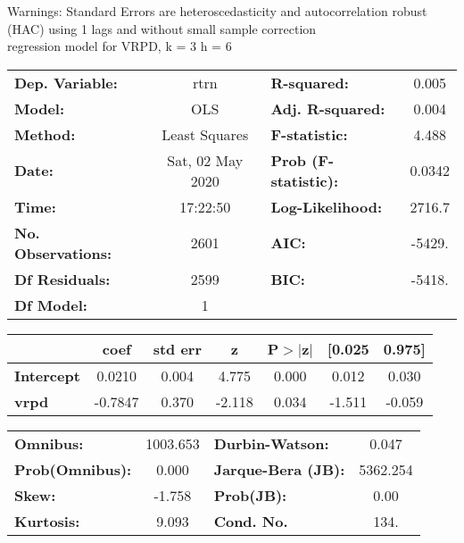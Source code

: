 Warnings: \newline
 [1] Standard Errors are heteroscedasticity and autocorrelation robust (HAC) using 1 lags and without small sample correction\\ 

regression model for VRPD, k = 3 h = 6\begin{center}
\begin{tabular}{lclc}
\toprule
\textbf{Dep. Variable:}    &       rtrn       & \textbf{  R-squared:         } &     0.005   \\
\textbf{Model:}            &       OLS        & \textbf{  Adj. R-squared:    } &     0.004   \\
\textbf{Method:}           &  Least Squares   & \textbf{  F-statistic:       } &     4.488   \\
\textbf{Date:}             & Sat, 02 May 2020 & \textbf{  Prob (F-statistic):} &   0.0342    \\
\textbf{Time:}             &     17:22:50     & \textbf{  Log-Likelihood:    } &    2716.7   \\
\textbf{No. Observations:} &        2601      & \textbf{  AIC:               } &    -5429.   \\
\textbf{Df Residuals:}     &        2599      & \textbf{  BIC:               } &    -5418.   \\
\textbf{Df Model:}         &           1      & \textbf{                     } &             \\
\bottomrule
\end{tabular}
\begin{tabular}{lcccccc}
                   & \textbf{coef} & \textbf{std err} & \textbf{z} & \textbf{P$> |$z$|$} & \textbf{[0.025} & \textbf{0.975]}  \\
\midrule
\textbf{Intercept} &       0.0210  &        0.004     &     4.775  &         0.000        &        0.012    &        0.030     \\
\textbf{vrpd}      &      -0.7847  &        0.370     &    -2.118  &         0.034        &       -1.511    &       -0.059     \\
\bottomrule
\end{tabular}
\begin{tabular}{lclc}
\textbf{Omnibus:}       & 1003.653 & \textbf{  Durbin-Watson:     } &    0.047  \\
\textbf{Prob(Omnibus):} &   0.000  & \textbf{  Jarque-Bera (JB):  } & 5362.254  \\
\textbf{Skew:}          &  -1.758  & \textbf{  Prob(JB):          } &     0.00  \\
\textbf{Kurtosis:}      &   9.093  & \textbf{  Cond. No.          } &     134.  \\
\bottomrule
\end{tabular}
\end{center}

